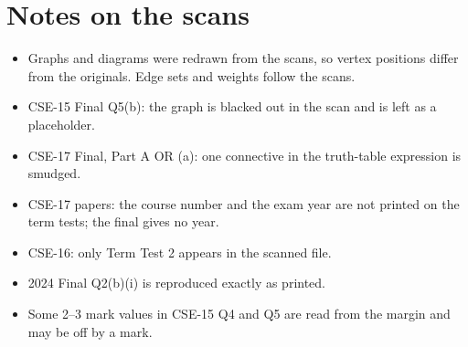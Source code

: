 \documentclass[11pt,a4paper]{article}
\begin{document}
\clearpage
\section{Notes on the scans}
\begin{itemize}[itemsep=2pt]
\item Graphs and diagrams were redrawn from the scans, so vertex positions differ from the originals. Edge sets and weights follow the scans.
\item CSE-15 Final Q5(b): the graph is blacked out in the scan and is left as a placeholder.
\item CSE-17 Final, Part A OR (a): one connective in the truth-table expression is smudged.
\item CSE-17 papers: the course number and the exam year are not printed on the term tests; the final gives no year.
\item CSE-16: only Term Test 2 appears in the scanned file.
\item 2024 Final Q2(b)(i) is reproduced exactly as printed.
\item Some 2--3 mark values in CSE-15 Q4 and Q5 are read from the margin and may be off by a mark.
\end{itemize}
\end{document}
